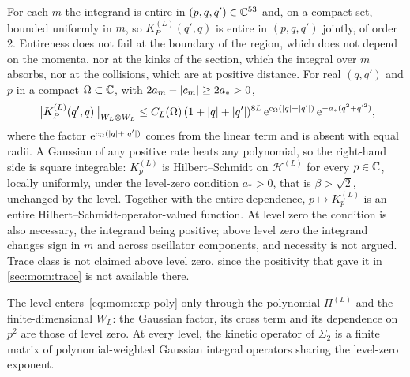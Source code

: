 For each $m$ the integrand is entire in $(p, q, q') \in \mathbb{C}^{53}$ and, on a compact set, bounded uniformly in $m$, so $K^{(L)}_P(q', q)$ is entire in $(p, q, q')$ jointly, of order 2.
Entireness does not fail at the boundary of the region, which does not depend on the momenta, nor at the kinks of the section, which the integral over $m$ absorbs, nor at the collisions, which are at positive distance.
For real $(q, q')$ and $p$ in a compact $\Omega \subset \mathbb{C}$, with $2 a_m - {|c_m|} \ge 2 a_* > 0$,
\begin{equation}
  \label{eq:mom:hs-bound}
  \big\| K^{(L)}_P(q', q) \big\|_{W_L \otimes W_L}
    \le C_L(\Omega) \, (1 + {|q|} + {|q'|})^{8 L} \, \mathrm{e}^{c_\Omega ({|q|} + {|q'|})} \, \mathrm{e}^{- a_* (q^2 + q'^2)},
\end{equation}
where the factor $\mathrm{e}^{c_\Omega ({|q|} + {|q'|})}$ comes from the linear term and is absent with equal radii.
A Gaussian of any positive rate beats any polynomial, so the right-hand side is square integrable: $K^{(L)}_p$ is Hilbert--Schmidt on $\mathcal H^{(L)}$ for every $p \in \mathbb{C}$, locally uniformly, under the level-zero condition $a_* > 0$, that is $\beta > \sqrt{2}$, unchanged by the level.
Together with the entire dependence, $p \mapsto K^{(L)}_p$ is an entire Hilbert--Schmidt-operator-valued function.
At level zero the condition is also necessary, the integrand being positive; above level zero the integrand changes sign in $m$ and across oscillator components, and necessity is not argued.
Trace class is not claimed above level zero, since the positivity that gave it in \cref{sec:mom:trace} is not available there.

The level enters~\eqref{eq:mom:exp-poly} only through the polynomial $\Pi^{(L)}$ and the finite-dimensional $W_L$: the Gaussian factor, its cross term and its dependence on $p^2$ are those of level zero.
At every level, the kinetic operator of $\Sigma_2$ is a finite matrix of polynomial-weighted Gaussian integral operators sharing the level-zero exponent.

